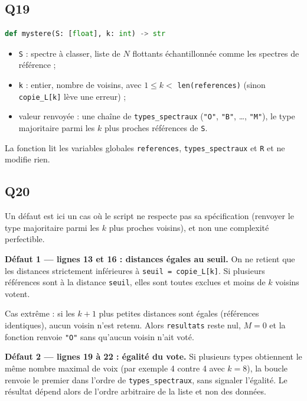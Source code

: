 \documentclass[11pt,a4paper]{article}
\providecommand{\tightlist}{\setlength{\itemsep}{0pt}\setlength{\parskip}{0pt}}
\begin{document}
\hypertarget{q19}{%
\subsection{Q19}\label{q19}}

\begin{lstlisting}[language=Python]
def mystere(S: [float], k: int) -> str
\end{lstlisting}

\begin{itemize}
\tightlist
\item
  \texttt{S} : spectre à classer, liste de \(N\) flottants échantillonnée comme les spectres de référence ;
\item
  \texttt{k} : entier, nombre de voisins, avec \(1 \leqslant k <\) \texttt{len(references)} (sinon \texttt{copie\_L{[}k{]}} lève une erreur) ;
\item
  valeur renvoyée : une chaîne de \texttt{types\_spectraux} (\texttt{"O"}, \texttt{"B"}, \ldots, \texttt{"M"}), le type majoritaire parmi les \(k\) plus proches références de \texttt{S}.
\end{itemize}

La fonction lit les variables globales \texttt{references}, \texttt{types\_spectraux} et \texttt{R} et ne modifie rien.

\hypertarget{q20}{%
\subsection{Q20}\label{q20}}

Un défaut est ici un cas où le script ne respecte pas sa spécification (renvoyer le type majoritaire parmi les \(k\) plus proches voisins), et non une complexité perfectible.

\textbf{Défaut 1 --- lignes 13 et 16 : distances égales au seuil.} On ne retient que les distances strictement inférieures à \texttt{seuil\ =\allowbreak{}\ copie\_L{[}k{]}\allowbreak{}}. Si plusieurs références sont à la distance \texttt{seuil}, elles sont toutes exclues et moins de \(k\) voisins votent.

Cas extrême : si les \(k+1\) plus petites distances sont égales (références identiques), aucun voisin n'est retenu. Alors \texttt{resultats} reste nul, \(M = 0\) et la fonction renvoie \texttt{"O"} sans qu'aucun voisin n'ait voté.

\textbf{Défaut 2 --- lignes 19 à 22 : égalité du vote.} Si plusieurs types obtiennent le même nombre maximal de voix (par exemple 4 contre 4 avec \(k = 8\)), la boucle renvoie le premier dans l'ordre de \texttt{types\_spectraux}, sans signaler l'égalité. Le résultat dépend alors de l'ordre arbitraire de la liste et non des données.
\end{document}
